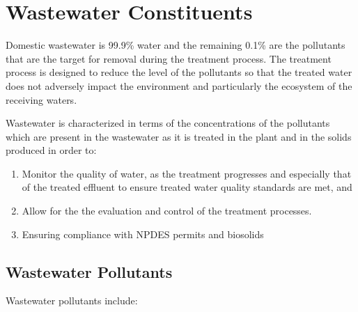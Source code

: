 
\chapter{Wastewater Constituents}

Domestic wastewater is 99.9\% water and the remaining 0.1\% are the pollutants that are the target for removal during the treatment process. The treatment process is designed to reduce the level of the pollutants so that the treated water does not adversely impact the environment and particularly the ecosystem of the receiving waters.

Wastewater is characterized in terms of the concentrations of the pollutants which are present in the wastewater as it is treated in the plant and in the solids produced in order to:

\begin{enumerate}
\item Monitor the quality of water, as the treatment progresses and especially that of the treated effluent to ensure treated water quality standards are met, and 
\item Allow for the the evaluation and control of the treatment processes.
\item Ensuring compliance with NPDES permits and biosolids  
\end{enumerate}

\section{Wastewater Pollutants}



Wastewater pollutants include:

